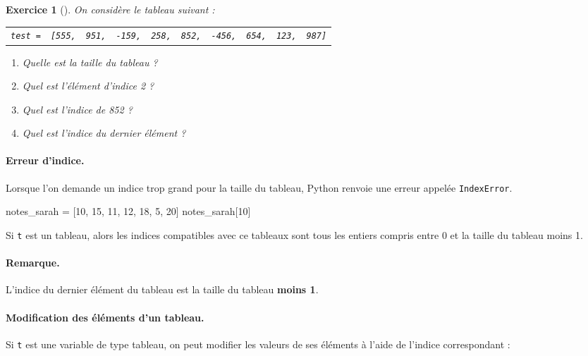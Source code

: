 \documentclass[12pt]{article}                   %
\newcounter{exoscount}
\theoremstyle{exercicestyle}
\newtheorem{exos}[exoscount]{Exercice}
\newenvironment{exo}[2]
  {
   \begin{exos}[#1]
   \leavevmode
   \marginpar{\hfill $#2 $ }}
  {\end{exos}}
\theoremstyle{break2}
\theoremstyle{break3}
\begin{document}
\begin{exo}{}{  }
    On considère le tableau suivant :
\begin{center}
\begin{tabular}{M{3cm}ccccccccc}
    \texttt{test =} & \texttt{[555,} & \texttt{951,} & \texttt{-159,} & \texttt{258,} & \texttt{852,} & \texttt{-456,} & \texttt{654,}  & \texttt{123,} & \texttt{987]}\\
\end{tabular}
\end{center}
\begin{enumerate}
    \item Quelle est la taille du tableau ? \dotfill
    \item Quel est l'élément d'indice 2 ? \dotfill
    \item Quel est l'indice de 852 ? \dotfill
    \item Quel est l'indice du dernier élément ? \dotfill
\end{enumerate}

\end{exo} 

\paragraph{Erreur d'indice.} Lorsque l'on demande un indice trop grand pour la taille du tableau, Python renvoie une erreur appelée \texttt{IndexError}.

\begin{pyconsole}[][frame=single, framesep=2mm, label=Console Python,linenos=true]
notes_sarah = [10, 15, 11, 12, 18, 5, 20]
notes_sarah[10]
\end{pyconsole}

Si \texttt{t} est un tableau, alors les indices compatibles avec ce tableaux sont tous les entiers compris entre 0 et la taille du tableau moins 1.

\paragraph{Remarque.} L'indice du dernier élément du tableau est la taille du tableau \textbf{moins 1}.

\paragraph{Modification des éléments d'un tableau.} Si \texttt{t} est une variable de type tableau, on peut modifier les valeurs de ses éléments à l'aide de l'indice correspondant :
\end{document}
